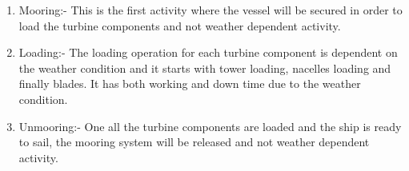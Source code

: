 \begin{enumerate}
\item Mooring:- This is the first activity where the vessel will be secured in order to load the turbine components and not weather dependent activity.
\item Loading:- The loading operation for each turbine component is dependent on the weather condition and it starts with tower loading, nacelles loading and finally blades. It has both working and down time due to the weather condition.
\item Unmooring:- One all the turbine components are loaded and the ship is ready to sail, the mooring system will be released and not weather dependent activity.
\end{enumerate}